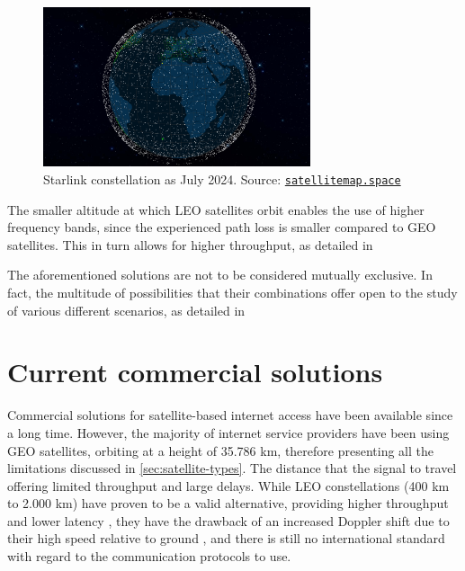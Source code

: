 \begin{figure}[ht]
    \centering
    \includegraphics[width=0.7\textwidth]{res/starlink-constellation.png}
    \caption{Starlink constellation as July 2024. Source: \href{https://satellitemap.space/}{\texttt{satellitemap.space}}}
    \label{fig:starlink_constellation}
\end{figure}

The smaller altitude at which \ac{LEO} satellites orbit enables the use of higher frequency bands, since the experienced path loss is smaller compared to \ac{GEO} satellites. This in turn allows for higher throughput, as detailed in \cite{satellite-communication-mmwave-giordani}

The aforementioned solutions are not to be considered mutually exclusive. In fact, the multitude of possibilities that their combinations offer open to the study of various different scenarios, as detailed in \cite{potential-multilayered-nierarchical-ntn-wang}

\section{Current commercial solutions}
Commercial solutions for satellite-based internet access have been available since a long time. However, the majority of internet service providers have been using \ac{GEO} satellites, orbiting at a height of 35.786 km, therefore presenting all the limitations discussed in \ref{sec:satellite-types}. The distance that the signal  to travel offering limited throughput and large delays. While \ac{LEO} constellations (400 km to 2.000 km) have proven to be a valid alternative, providing higher throughput and lower latency \cite{main-features-5g-nr-ntn-yun}, they have the drawback of an increased Doppler shift due to their high speed relative to ground \cite{satellite-communication-mmwave-giordani}, and there is still no international standard with regard to the communication protocols to use. 

